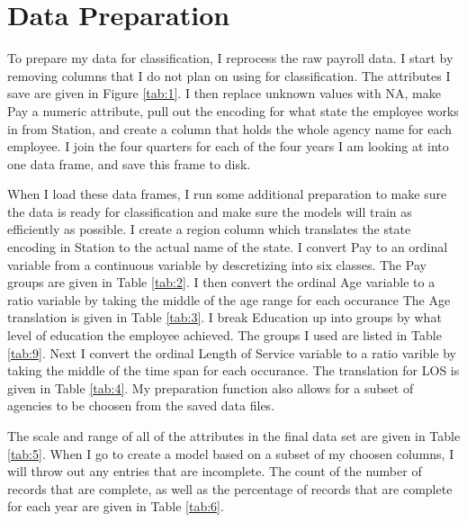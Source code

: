 \documentclass{article}
\begin{document}
\section{Data Preparation}
To prepare my data for classification, I reprocess the raw payroll data. I start by removing columns that I do not plan on using for classification. The attributes I save are given in Figure \ref{tab:1}. I then replace unknown values with NA, make Pay a numeric attribute, pull out the encoding for what state the employee works in from Station, and create a column that holds the whole agency name for each employee. I join the four quarters for each of the four years I am looking at into one data frame, and save this frame to disk.
\par
When I load these data frames, I run some additional preparation to make sure the data is ready for classification and make sure the models will train as efficiently as possible. I create a region column which translates the state encoding in Station to the actual name of the state. I convert Pay to an ordinal variable from a continuous variable by descretizing into six classes. The Pay groups are given in Table \ref{tab:2}. I then convert the ordinal Age variable to a ratio variable by taking the middle of the age range for each occurance The Age translation is given in Table \ref{tab:3}. I break Education up into groups by what level of education the employee achieved. The groups I used are listed in Table \ref{tab:9}. Next I convert the ordinal Length of Service variable to a ratio varible by taking the middle of the time span for each occurance. The translation for LOS is given in Table \ref{tab:4}. My preparation function also allows for a subset of agencies to be choosen from the saved data files.
\par
The scale and range of all of the attributes in the final data set are given in Table \ref{tab:5}. When I go to create a model based on a subset of my choosen columns, I will throw out any entries that are incomplete. The count of the number of records that are complete, as well as the percentage of records that are complete for each year are given in Table \ref{tab:6}.
\end{document}
